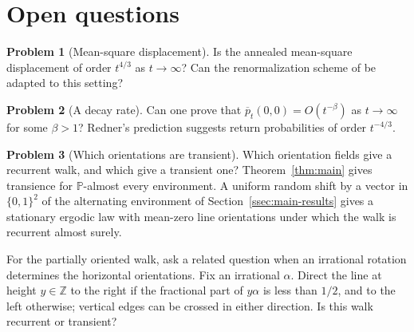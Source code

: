 \documentclass[11pt]{amsart}
\theoremstyle{plain}
\theoremstyle{definition}
\newtheorem{problem}{Problem}
\newcommand{\Z}{\mathbb Z}
\renewcommand{\P}{\mathbb P}
\newcommand{\1}{\mathbf 1}
\begin{document}
	\section{Open questions}\label{sec:open}
	\begin{problem}[Mean-square displacement]\label{prob:powerlaw}
		Is the annealed mean-square displacement of order $t^{4/3}$ as
		$t\to\infty$?
		Can the renormalization scheme of \citet*[Section~3]{ABK26} be
		adapted to this setting?
	\end{problem}
	
	\begin{problem}[A decay rate]\label{prob:pointwise}
	Can one prove that $\overline p_t(0,0)=O(t^{-\beta})$ as $t\to\infty$
	for some $\beta>1$? Redner's prediction \citep*[(3)]{Red89} suggests return probabilities of order $t^{-4/3}$.
\end{problem}


	
	
	
	\begin{problem}[Which orientations are transient]\label{prob:which}
		Which orientation fields give a recurrent walk, and which give a transient
		one?  Theorem~\ref{thm:main} gives transience for $\P$-almost every
		environment.  A uniform random shift by a vector in $\{0,1\}^2$ of the
		alternating environment of Section~\ref{ssec:main-results} gives a stationary
		ergodic law with mean-zero line orientations under which the walk is
		recurrent almost surely.

		For the partially oriented walk, \citet*[Section~4]{GLN08T} ask a related
		question when an irrational rotation determines the horizontal orientations.
		Fix an irrational $\alpha$.  Direct the line at height $y\in\Z$ to the right
		if the fractional part of $y\alpha$ is less than $1/2$, and to the left
		otherwise; vertical edges can be crossed in either direction.
		Is this walk recurrent or transient?
	\end{problem}
	
	
	
	
\end{document}
